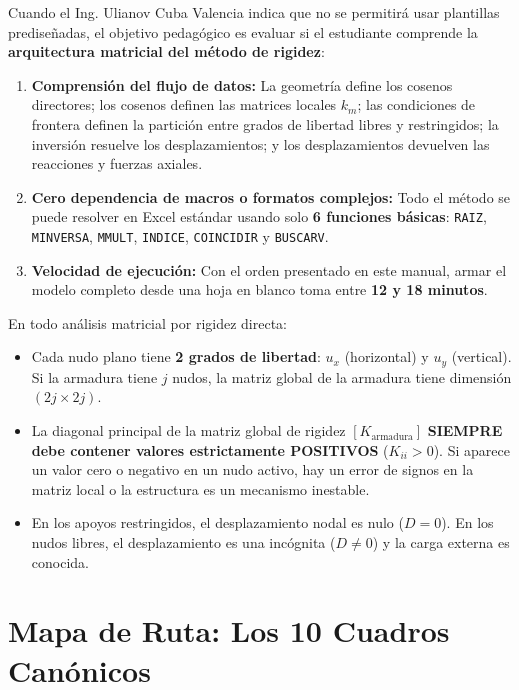 \documentclass[10pt,a4paper]{article}
\begin{document}
Cuando el Ing. Ulianov Cuba Valencia indica que no se permitirá usar plantillas prediseñadas, el objetivo pedagógico es evaluar si el estudiante comprende la \textbf{arquitectura matricial del método de rigidez}:
\begin{enumerate}
    \item \textbf{Comprensión del flujo de datos:} La geometría define los cosenos directores; los cosenos definen las matrices locales $k_m$; las condiciones de frontera definen la partición entre grados de libertad libres y restringidos; la inversión resuelve los desplazamientos; y los desplazamientos devuelven las reacciones y fuerzas axiales.
    \item \textbf{Cero dependencia de macros o formatos complejos:} Todo el método se puede resolver en Excel estándar usando solo \textbf{6 funciones básicas}: \texttt{RAIZ}, \texttt{MINVERSA}, \texttt{MMULT}, \texttt{INDICE}, \texttt{COINCIDIR} y \texttt{BUSCARV}.
    \item \textbf{Velocidad de ejecución:} Con el orden presentado en este manual, armar el modelo completo desde una hoja en blanco toma entre \textbf{12 y 18 minutos}.
\end{enumerate}

\begin{pedagcard}
En todo análisis matricial por rigidez directa:
\begin{itemize}
    \item Cada nudo plano tiene \textbf{2 grados de libertad}: $u_x$ (horizontal) y $u_y$ (vertical). Si la armadura tiene $j$ nudos, la matriz global de la armadura tiene dimensión $(2j \times 2j)$.
    \item La diagonal principal de la matriz global de rigidez $[K_{\text{armadura}}]$ \textbf{SIEMPRE debe contener valores estrictamente POSITIVOS} ($K_{ii} > 0$). Si aparece un valor cero o negativo en un nudo activo, hay un error de signos en la matriz local o la estructura es un mecanismo inestable.
    \item En los apoyos restringidos, el desplazamiento nodal es nulo ($D = 0$). En los nudos libres, el desplazamiento es una incógnita ($D \neq 0$) y la carga externa es conocida.
\end{itemize}
\end{pedagcard}

\section{Mapa de Ruta: Los 10 Cuadros Canónicos}
\end{document}
